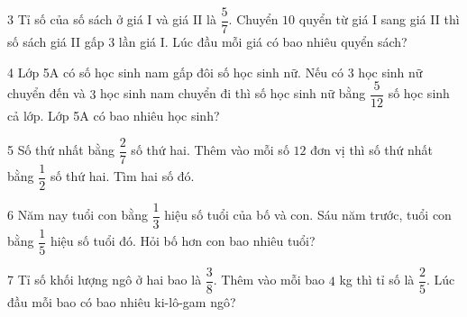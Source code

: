 \gap
\begin{probbox}{3}{\relax}
Tỉ số của số sách ở giá I và giá II là $\dfrac57$. Chuyển $10$ quyển từ giá I sang giá II thì số sách giá II gấp $3$ lần giá I. Lúc đầu mỗi giá có bao nhiêu quyển sách?
\end{probbox}
\gap
\begin{probbox}{4}{\relax}
Lớp 5A có số học sinh nam gấp đôi số học sinh nữ. Nếu có $3$ học sinh nữ chuyển đến và $3$ học sinh nam chuyển đi thì số học sinh nữ bằng $\dfrac5{12}$ số học sinh cả lớp. Lớp 5A có bao nhiêu học sinh?
\end{probbox}
\gap
\begin{probbox}{5}{\relax}
Số thứ nhất bằng $\dfrac27$ số thứ hai. Thêm vào mỗi số $12$ đơn vị thì số thứ nhất bằng $\dfrac12$ số thứ hai. Tìm hai số đó.
\end{probbox}
\gap
\begin{probbox}{6}{\relax}
Năm nay tuổi con bằng $\dfrac13$ hiệu số tuổi của bố và con. Sáu năm trước, tuổi con bằng $\dfrac15$ hiệu số tuổi đó. Hỏi bố hơn con bao nhiêu tuổi?
\end{probbox}
\gap
\begin{probbox}{7}{\relax}
Tỉ số khối lượng ngô ở hai bao là $\dfrac38$. Thêm vào mỗi bao $4$ kg thì tỉ số là $\dfrac25$. Lúc đầu mỗi bao có bao nhiêu ki-lô-gam ngô?
\end{probbox}
